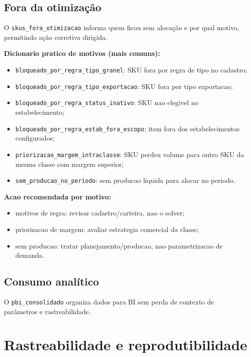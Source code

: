 \documentclass[11pt,a4paper]{article}
\begin{document}
\subsection{Fora da otimização}

O \texttt{skus\_fora\_otimizacao} informa quem ficou sem alocação e por qual
motivo, permitindo ação corretiva dirigida.

\textbf{Dicionario pratico de motivos (mais comuns):}
\begin{itemize}[leftmargin=1.2cm]
    \item \texttt{bloqueado\_por\_regra\_tipo\_granel}: SKU fora por regra de tipo no cadastro;
    \item \texttt{bloqueado\_por\_regra\_tipo\_exportacao}: SKU fora por tipo exportacao;
    \item \texttt{bloqueado\_por\_regra\_status\_inativo}: SKU nao elegivel no estabelecimento;
    \item \texttt{bloqueado\_por\_regra\_estab\_fora\_escopo}: item fora dos estabelecimentos configurados;
    \item \texttt{priorizacao\_margem\_intraclasse}: SKU perdeu volume para outro SKU da mesma classe com margem superior;
    \item \texttt{sem\_producao\_no\_periodo}: sem producao liquida para alocar no periodo.
\end{itemize}

\textbf{Acao recomendada por motivo:}
\begin{itemize}[leftmargin=1.2cm]
    \item motivos de regra: revisar cadastro/carteira, nao o solver;
    \item priorizacao de margem: avaliar estrategia comercial da classe;
    \item sem producao: tratar planejamento/producao, nao parametrizacao de demanda.
\end{itemize}

\subsection{Consumo analítico}

O \texttt{pbi\_consolidado} organiza dados para BI sem perda de contexto de
parâmetros e rastreabilidade.

\section{Rastreabilidade e reprodutibilidade}
\label{sec:rastreabilidade}
\end{document}
